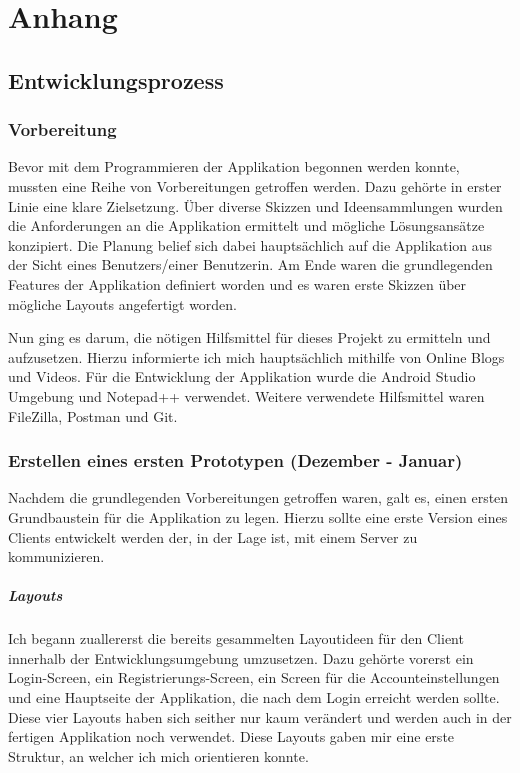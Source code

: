 \documentclass[../main.tex]{subfiles}
\begin{document}
	
	\chapter{Anhang}
	
	\section{Entwicklungsprozess}
	
	\subsection{Vorbereitung}
	Bevor mit dem Programmieren der Applikation begonnen werden konnte, mussten eine Reihe von Vorbereitungen getroffen werden. Dazu gehörte in erster Linie eine klare Zielsetzung. Über diverse Skizzen und Ideensammlungen wurden die Anforderungen an die Applikation ermittelt und mögliche Lösungsansätze konzipiert. Die Planung belief sich dabei hauptsächlich auf die Applikation aus der Sicht eines Benutzers/einer Benutzerin. Am Ende waren die grundlegenden Features der Applikation definiert worden und es waren erste Skizzen über mögliche Layouts angefertigt worden.
	
	Nun ging es darum, die nötigen Hilfsmittel für dieses Projekt zu ermitteln und aufzusetzen. Hierzu informierte ich mich hauptsächlich mithilfe von Online Blogs und Videos. Für die Entwicklung der Applikation wurde die Android Studio Umgebung und Notepad++ verwendet. Weitere verwendete Hilfsmittel waren FileZilla, Postman und Git.
	
	\subsection{Erstellen eines ersten Prototypen (Dezember - Januar)}
	Nachdem die grundlegenden Vorbereitungen getroffen waren, galt es, einen ersten Grundbaustein für die Applikation zu legen. Hierzu sollte eine erste Version eines Clients entwickelt werden der, in der Lage ist, mit einem Server zu kommunizieren.
	
	\paragraph{Layouts}
	Ich begann zuallererst die bereits gesammelten Layoutideen für den Client innerhalb der Entwicklungsumgebung umzusetzen. Dazu gehörte vorerst ein Login-Screen, ein Registrierungs-Screen, ein Screen für die Accounteinstellungen und eine Hauptseite der Applikation, die nach dem Login erreicht werden sollte. Diese vier Layouts haben sich seither nur kaum verändert und werden auch in der fertigen Applikation noch verwendet. Diese Layouts gaben mir eine erste Struktur, an welcher ich mich orientieren konnte.
	
\end{document}
